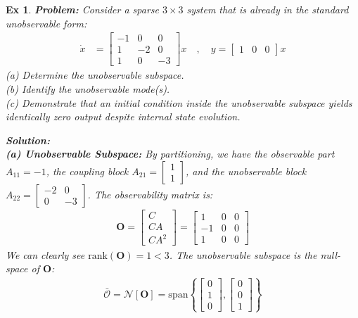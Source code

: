 \documentclass[twoside]{article}
\newtheorem{exmp}[theorem]{Ex}
\begin{document}
\begin{exmp}
\textbf{Problem:} Consider a sparse $3 \times 3$ system that is already in the standard unobservable form:
\begin{align*}
    \dot{x} &= \begin{bmatrix} -1 & 0 & 0 \\ 1 & -2 & 0 \\ 1 & 0 & -3 \end{bmatrix} x \quad , \quad y = \begin{bmatrix} 1 & 0 & 0 \end{bmatrix} x
\end{align*}
(a) Determine the unobservable subspace.\\
(b) Identify the unobservable mode(s).\\
(c) Demonstrate that an initial condition inside the unobservable subspace yields identically zero output despite internal state evolution.

\textbf{Solution:} \\
\textbf{(a) Unobservable Subspace:} By partitioning, we have the observable part $A_{11} = -1$, the coupling block $A_{21} = \begin{bmatrix} 1 \\ 1 \end{bmatrix}$, and the unobservable block $A_{22} = \begin{bmatrix} -2 & 0 \\ 0 & -3 \end{bmatrix}$. The observability matrix is:
\begin{align*}
    \mathbf{O} = \begin{bmatrix} C \\ C A \\ C A^2 \end{bmatrix} = \begin{bmatrix} 1 & 0 & 0 \\ -1 & 0 & 0 \\ 1 & 0 & 0 \end{bmatrix}
\end{align*}
We can clearly see $\mathrm{rank}(\mathbf{O}) = 1 < 3$. The unobservable subspace is the null-space of $\mathbf{O}$:
\begin{align*}
    \bar{\mathcal{O}} = \mathcal{N}[\mathbf{O}] = \mathrm{span}\left\{ \begin{bmatrix} 0 \\ 1 \\ 0 \end{bmatrix} , \begin{bmatrix} 0 \\ 0 \\ 1 \end{bmatrix} \right\}
\end{align*}


\end{exmp}
\end{document}
